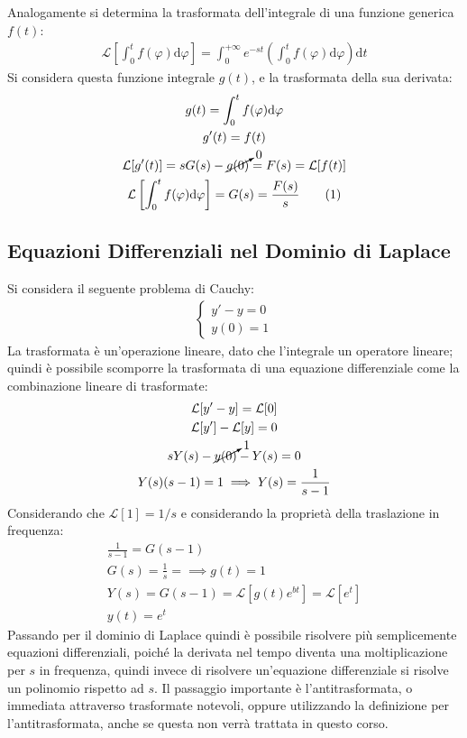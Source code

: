 \documentclass{article}
\newcommand{\df}{\mathrm{d}}
\newcommand{\intab}[4]{\displaystyle\int_{#1}^{#2}{#3}\df{#4}}
\newcommand{\intpinf}[2]{\intab{0}{+\infty}{#1}{#2}}
\numberwithin{equation}{subsection}
\newcommand{\tageq}{\tag{\stepcounter{equation}\theequation}}
\begin{document}
Analogamente si determina la trasformata dell'integrale di una funzione generica $f(t)$:
\begin{gather*}
    \mathcal{L}\left[\int_0^t f(\varphi)\df \varphi\right]=\intpinf{e^{-st}\left(\int_0^t f(\varphi)\df\varphi\right)}{t}
\end{gather*}
Si considera questa funzione integrale $g(t)$, e la trasformata della sua derivata:
\begin{gather*}
    g(t)=\int_0^t f(\varphi)\df\varphi\\
    g'(t)=f(t)\\
    \mathcal{L}[g'(t)]=sG(s)-\cancelto{0}{g(0)}=F(s)=\mathcal{L}[f(t)]\\
    \mathcal{L}\left[\int_0^tf(\varphi)\df\varphi\right]=G(s)=\frac{F(s)}{s}\tageq
\end{gather*}

\subsection{Equazioni Differenziali nel Dominio di Laplace}

Si considera il seguente problema di Cauchy:
\begin{gather*}
    \begin{cases}
        y'-y=0\\
        y(0)=1
    \end{cases}
\end{gather*}
La trasformata è un'operazione lineare, dato che l'integrale un operatore lineare; quindi è possibile scomporre la trasformata di una equazione differenziale come la combinazione lineare di trasformate:
\begin{gather*}
    \mathcal{L}[y'-y]=\mathcal{L}[0]\\
    \mathcal{L}[y']-\mathcal{L}[y]=0\\
    sY(s)-\cancelto{1}{y(0)}-Y(s)=0\\
    Y(s)(s-1)=1\implies Y(s)=\frac{1}{s-1}
\end{gather*}
Considerando che $\mathcal{L}[1]=1/s$ e considerando la proprietà della traslazione in frequenza:
\begin{gather*}
    \frac{1}{s-1}=G(s-1)\\
    G(s)=\frac{1}{s}=\implies g(t)=1\\
    Y(s)=G(s-1)=\mathcal{L}[g(t)e^{bt}]=\mathcal{L}[e^t]\\
    y(t)=e^{t}
\end{gather*}
Passando per il dominio di Laplace quindi è possibile risolvere più semplicemente equazioni differenziali, poiché la derivata nel tempo diventa una moltiplicazione per $s$ in frequenza, quindi invece di risolvere un'equazione differenziale si risolve un polinomio rispetto ad $s$. Il passaggio importante è l'antitrasformata, o immediata attraverso trasformate notevoli, oppure utilizzando la definizione per l'antitrasformata, anche se questa non verrà trattata in questo corso. 
\end{document}
